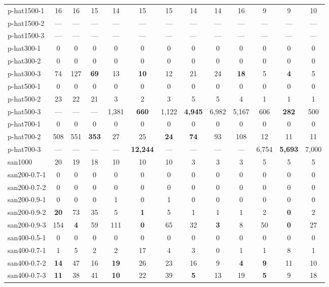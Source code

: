 \documentclass{l4proj}
\begin{document}
\begin{table}
\begin{center}
\begin{tiny}
\begin{tabular}{|l|c c c|c c c|c c c|c c c|}
p-hat1500-1 & 16 & 16 & 15 & 14 & 15 & 15 & 14 & 14 & 16 & 9 & 9 & 10 \\ 
p-hat1500-2 & --- & --- & --- & --- & --- & --- & --- & --- & --- & --- & --- & --- \\ 
p-hat1500-3 & --- & --- & --- & --- & --- & --- & --- & --- & --- & --- & --- & --- \\ 
p-hat300-1 & 0 & 0 & 0 & 0 & 0 & 0 & 0 & 0 & 0 & 0 & 0 & 0 \\ 
p-hat300-2 & 0 & 0 & 0 & 0 & 0 & 0 & 0 & 0 & 0 & 0 & 0 & 0 \\ 
p-hat300-3 & 74 & 127 & \bf{69} & 13 & \bf{10} & 12 & 21 & 24 & \bf{18} & 5 & \bf{4} & 5 \\ 
p-hat500-1 & 0 & 0 & 0 & 0 & 0 & 0 & 0 & 0 & 0 & 0 & 0 & 0 \\ 
p-hat500-2 & 23 & 22 & 21 & 3 & 2 & 3 & 5 & 5 & 4 & 1 & 1 & 1 \\ 
p-hat500-3 & --- & --- & --- & 1,381 & \bf{660} & 1,122 & \bf{4,945} & 6,982 & 5,167 & 606 & \bf{282} & 500 \\ 
p-hat700-1 & 0 & 0 & 0 & 0 & 0 & 0 & 0 & 0 & 0 & 0 & 0 & 0 \\ 
p-hat700-2 & 508 & 551 & \bf{353} & 27 & 25 & \bf{24} & \bf{74} & 93 & 108 & 12 & 11 & 11 \\ 
p-hat700-3 & --- & --- & --- & --- & \bf{12,244} & --- & --- & --- & --- & 6,754 & \bf{5,693} & 7,000 \\ 
san1000 & 20 & 19 & 18 & 10 & 10 & 10 & 3 & 3 & 3 & 5 & 5 & 5 \\ 
san200-0.7-1 & 0 & 0 & 0 & 0 & 0 & 0 & 0 & 0 & 0 & 0 & 0 & 0 \\ 
san200-0.7-2 & 0 & 0 & 0 & 0 & 0 & 0 & 0 & 0 & 0 & 0 & 0 & 0 \\ 
san200-0.9-1 & 0 & 0 & 0 & 1 & 0 & 1 & 0 & 0 & 0 & 0 & 0 & 0 \\ 
san200-0.9-2 & \bf{20} & 73 & 35 & 5 & \bf{1} & 5 & 1 & 1 & 1 & 2 & \bf{0} & 2 \\ 
san200-0.9-3 & 154 & \bf{4} & 59 & 111 & \bf{0} & 65 & 32 & \bf{3} & 8 & 50 & \bf{0} & 27 \\ 
san400-0.5-1 & 0 & 0 & 0 & 0 & 0 & 0 & 0 & 0 & 0 & 0 & 0 & 0 \\ 
san400-0.7-1 & 1 & 5 & 2 & 2 & 17 & 4 & 3 & 0 & 1 & 1 & 8 & 1 \\ 
san400-0.7-2 & \bf{14} & 47 & 16 & \bf{19} & 26 & 23 & 16 & 9 & \bf{4} & \bf{9} & 11 & 10 \\ 
san400-0.7-3 & \bf{11} & 38 & 41 & \bf{10} & 22 & 39 & \bf{5} & 13 & 19 & \bf{5} & 9 & 18 \\ 

\end{tabular}
\end{tiny}
\end{center}
\end{table}
\end{document}

